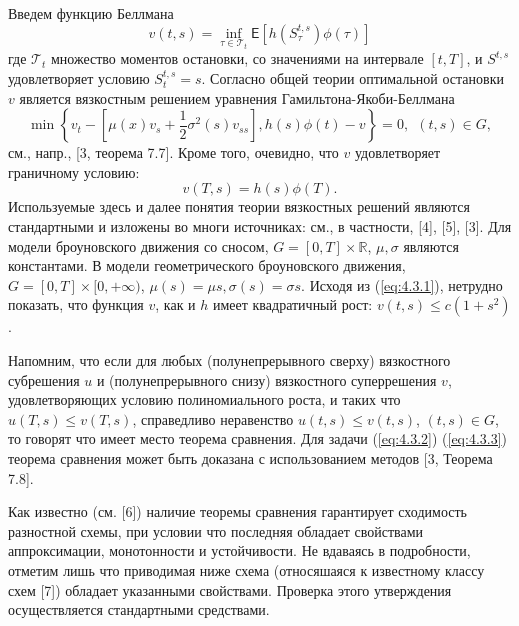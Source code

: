 Введем функцию Беллмана
\begin{equation}
\label{eq:4.3.1}
v(t,s)=\inf_{\tau \in \mathcal T_t} \mathsf E \left[ h(S^{t,s}_\tau)\phi(\tau) \right]
\end{equation}
где $\mathcal T_t$ множество моментов остановки, со значениями на интервале $[t,T]$, и $S^{t,s}$ удовлетворяет условию  $S^{t,s}_t=s$. Согласно общей теории оптимальной остановки $v$ является вязкостным решением уравнения Гамильтона-Якоби-Беллмана
\begin{equation}
\label{eq:4.3.2}
\min{\left\{v_t - [\mu(x)v_{s}+\frac{1}{2}\sigma^2(s) v_{ss}],h(s)\phi(t)-v\right\}}=0,\ \  (t,s)\in G,
\end{equation}
см., напр., [3, теорема 7.7].
Кроме того, очевидно, что $v$ удовлетворяет граничному условию:
\begin{equation}
 \label{eq:4.3.3}
v(T,s)=h(s)\phi(T).
\end{equation}
Используемые здесь и далее понятия теории вязкостных решений являются стандартными и изложены во многи источниках: см., в частности, [4], [5], [3].
Для модели броуновского движения со сносом, $G=[0,T] \times\mathbb R$, $\mu, \sigma$ являются константами.
В модели геометрического броуновского движения,$G=[0,T] \times [0,+\infty)$, $\mu(s)=\mu s, \sigma(s)=\sigma s$.
Исходя из (\ref{eq:4.3.1}), нетрудно показать, что функция $v$, как и $h$  имеет квадратичный рост: $v(t,s) \le c(1+s^2)$.

Напомним, что если для любых (полунепрерывного сверху) вязкостного субрешения $u$ и (полунепрерывного снизу) вязкостного суперрешения $v$, удовлетворяющих условию полиномиального роста,
и таких что $u(T,s) \le v(T,s)$, справедливо неравенство $u(t,s) \le v(t,s)$, $(t,s) \in G$, то говорят что имеет место теорема сравнения.
 Для задачи (\ref{eq:4.3.2}) (\ref{eq:4.3.3}) теорема сравнения может быть доказана с использованием методов [3, Теорема 7.8].

Как известно (см. [6]) наличие теоремы сравнения гарантирует сходимость разностной схемы, при условии что последняя обладает свойствами аппроксимации, монотонности и устойчивости. Не вдаваясь в подробности, отметим лишь что приводимая ниже схема (относяшаяся к известному классу схем [7]) обладает указанными свойствами. Проверка этого утверждения осуществляется стандартными средствами.

